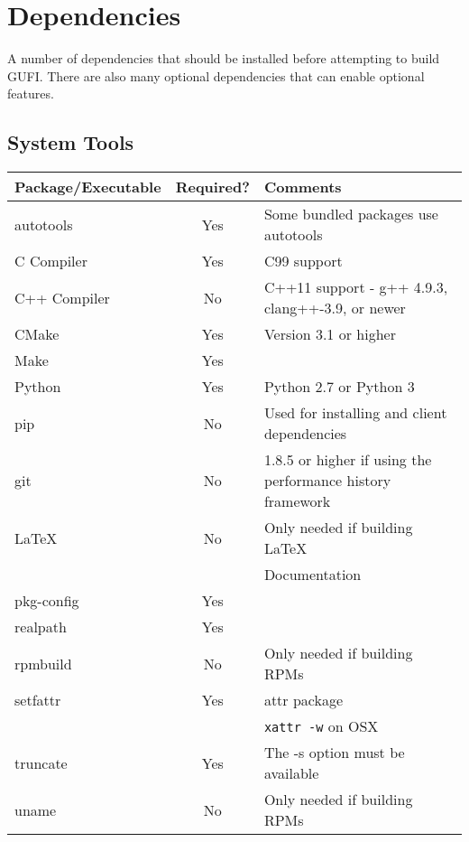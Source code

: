 \section{Dependencies}
A number of dependencies that should be installed before attempting to
build GUFI. There are also many optional dependencies that can enable
optional features.

\subsection{System Tools}
\begin{tabularx}{\textwidth}{| l | c | X | }
  \hline
  Package/Executable & Required? & Comments \\
  \hline
  autotools & Yes & Some bundled packages use autotools \\
  \hline
  C Compiler & Yes & C99 support \\
  \hline
  C++ Compiler & No & C++11 support - g++ 4.9.3, clang++-3.9, or newer
  \hfill \\
  \hline
  CMake & Yes & Version 3.1 or higher \\
  \hline
  Make & Yes & \\
  \hline
  Python & Yes & Python 2.7 or Python 3 \\
  \hline
  pip & No & Used for installing and client dependencies \\
  \hline
  git & No & 1.8.5 or higher if using the performance history
  framework \\
  \hline
  \LaTeX & No & Only needed if building \LaTeX \hfill \\
  & & Documentation \hfill \\
  \hline
  pkg-config & Yes & \\
  \hline
  realpath & Yes & \\
  \hline
  rpmbuild & No & Only needed if building RPMs \\
  \hline
  setfattr & Yes & attr package \\
  & & \texttt{xattr -w} on OSX \\
  \hline
  truncate & Yes & The -s option must be available \\
  \hline
  uname & No & Only needed if building RPMs \\
  \hline
\end{tabularx}

